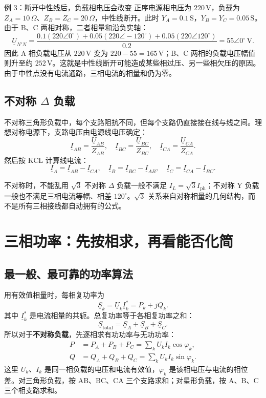 \documentclass[circuit]{CarlosTexRpt}
\newcommand{\phas}[1]{\underline{#1}}
\newcommand{\dgr}{^\circ}
\begin{document}
\begin{examplebox}{例 3：断开中性线后，负载相电压会改变}
正序电源相电压为 \(220\,\mathrm V\)，负载为 \(Z_A=10\,\Omega\)、\(Z_B=Z_C=20\,\Omega\)，中性线断开。此时 \(Y_A=0.1\,\mathrm S\)，\(Y_B=Y_C=0.05\,\mathrm S\)。由于 B、C 两相对称，二者相量和沿负实轴：
\[
  \phas U_{N'N}=\frac{0.1(220\angle0\dgr)+0.05(220\angle-120\dgr)+0.05(220\angle120\dgr)}{0.2}
  =55\angle0\dgr\,\mathrm V.
\]
因此 A 相负载电压从 \(220\,\mathrm V\) 变为 \(220-55=165\,\mathrm V\)；B、C 两相的负载电压幅值则升至约 \(252\,\mathrm V\)。这就是中性线断开可能造成某些相过压、另一些相欠压的原因。由于中性点没有电流通路，三相电流的相量和仍为零。
\end{examplebox}

\subsection{不对称 \texorpdfstring{$\Delta$}{Delta} 负载}

不对称三角形负载中，每个支路阻抗不同，但每个支路仍直接接在线与线之间。理想对称电源下，支路电压由电源线电压确定：
\begin{equation}
  \phas I_{AB}=\frac{\phas U_{AB}}{Z_{AB}},\quad
  \phas I_{BC}=\frac{\phas U_{BC}}{Z_{BC}},\quad
  \phas I_{CA}=\frac{\phas U_{CA}}{Z_{CA}}.
\end{equation}
然后按 KCL 计算线电流：
\[
  \phas I_A=\phas I_{AB}-\phas I_{CA},\quad
  \phas I_B=\phas I_{BC}-\phas I_{AB},\quad
  \phas I_C=\phas I_{CA}-\phas I_{BC}.
\]
\begin{warningbox}{不对称时，不能乱用 \(\sqrt3\)}
不对称 \(\Delta\) 负载一般不满足 \(I_L=\sqrt3 I_{\mathrm{ph}}\)；不对称 Y 负载一般也不满足三相电流等幅、相差 \(120^\circ\)。\(\sqrt3\) 关系来自对称相量的几何结构，而不是所有三相接线都自动拥有的公式。
\end{warningbox}

\section{三相功率：先按相求，再看能否化简}

\subsection{最一般、最可靠的功率算法}

用有效值相量时，每相复功率为
\begin{equation}
  \phas S_k=\phas U_k\phas I_k^*=P_k+jQ_k.
\end{equation}
其中 \(\phas I_k^*\) 是电流相量的共轭。总复功率等于各相复功率之和：
\begin{equation}
  \boxed{\phas S_{\mathrm{total}}=\phas S_A+\phas S_B+\phas S_C}.
\end{equation}
所以对于\textbf{不对称负载}，先逐相求有功功率与无功功率：
\begin{align}
  P&=P_A+P_B+P_C=\sum_k U_k I_k\cos\varphi_k,\\
  Q&=Q_A+Q_B+Q_C=\sum_k U_k I_k\sin\varphi_k.
\end{align}
这里 \(U_k\)、\(I_k\) 是同一相负载的电压和电流有效值，\(\varphi_k\) 是该相电压与电流的相位差。对三角形负载，按 AB、BC、CA 三个支路求和；对星形负载，按 A、B、C 三个相支路求和。
\end{document}
